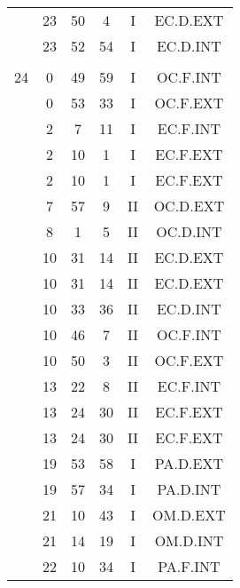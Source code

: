 \documentclass[12pt, a4paper]{article}
\begin{document}
\begin{multicols}{3}
{\begin{tabular}{c c c c c c}
	 	 	 	 & 23 & 50 & 4 & I & EC.D.EXT\\%
	 	 	 	 & 23 & 52 & 54 & I & EC.D.INT\\%
	 	 	 	 & & & & & \\%
	 	 	 	24 & 0 & 49 & 59 & I & OC.F.INT\\%
	 	 	 	 & 0 & 53 & 33 & I & OC.F.EXT\\%
	 	 	 	 & 2 & 7 & 11 & I & EC.F.INT\\%
	 	 	 	 & 2 & 10 & 1 & I & EC.F.EXT\\%
	 	 	 	 & 2 & 10 & 1 & I & EC.F.EXT\\%
	 	 	 	 & 7 & 57 & 9 & II & OC.D.EXT\\%
	 	 	 	 & 8 & 1 & 5 & II & OC.D.INT\\%
	 	 	 	 & 10 & 31 & 14 & II & EC.D.EXT\\%
	 	 	 	 & 10 & 31 & 14 & II & EC.D.EXT\\%
	 	 	 	 & 10 & 33 & 36 & II & EC.D.INT\\%
	 	 	 	 & 10 & 46 & 7 & II & OC.F.INT\\%
	 	 	 	 & 10 & 50 & 3 & II & OC.F.EXT\\%
	 	 	 	 & 13 & 22 & 8 & II & EC.F.INT\\%
	 	 	 	 & 13 & 24 & 30 & II & EC.F.EXT\\%
	 	 	 	 & 13 & 24 & 30 & II & EC.F.EXT\\%
	 	 	 	 & 19 & 53 & 58 & I & PA.D.EXT\\%
	 	 	 	 & 19 & 57 & 34 & I & PA.D.INT\\%
	 	 	 	 & 21 & 10 & 43 & I & OM.D.EXT\\%
	 	 	 	 & 21 & 14 & 19 & I & OM.D.INT\\%
	 	 	 	 & 22 & 10 & 34 & I & PA.F.INT\\%

\end{tabular}}
\end{multicols}
\end{document}
